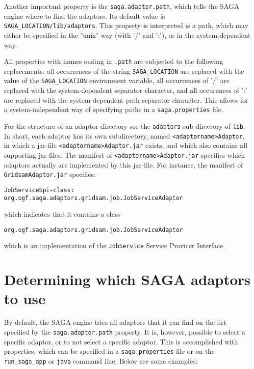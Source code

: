 \documentclass[a4paper,10pt]{article}
\begin{document}
Another important property is the \texttt{saga.adaptor.path},
which tells the SAGA engine where to find the adaptors.
Its default value is \texttt{SAGA\_LOCATION/lib/adaptors}.
This property is interpreted is a path, which may either be specified in the
"unix" way (with '/' and ':'), or in the system-dependent way.

All properties with names ending in \texttt{.path} are subjected to
the following replacements: all occurrences of the string
\texttt{SAGA\_LOCATION} are replaced with the value of the
\texttt{SAGA\_LOCATION} environment variable, all occurrences
of '/' are replaced with the system-dependent separator character,
and all occurences of ':' are replaced with the system-dependent
path separator character. This allows for a system-independent way
of specifying paths in a \texttt{saga.properties} file.

For the structure of an adaptor directory see the \texttt{adaptors}
sub-directory of \texttt{lib}.
In short, each adaptor has its own subdirectory, named
\texttt{<adaptorname>Adaptor},
in which a jar-file
\texttt{<adaptorname>Adaptor.jar}
exists, and which also contains
all supporting jar-files.
The manifest of
\texttt{<adaptorname>Adaptor.jar} specifies which adaptors actually
are implemented by this jar-file. For instance, 
the manifest of \texttt{GridsamAdaptor.jar} specifies:

\noindent
{\small
\begin{verbatim}
JobServiceSpi-class: org.ogf.saga.adaptors.gridsam.job.JobServiceAdaptor
\end{verbatim}
}
\noindent

which indicates that it contains a class
\noindent
{\small
\begin{verbatim}
org.ogf.saga.adaptors.gridsam.job.JobServiceAdaptor
\end{verbatim}
}
\noindent
which is an implementation of the \texttt{JobService}
Service Provicer Interface.

\section{Determining which SAGA adaptors to use}

By default, the SAGA engine tries all adaptors that it can find on the list
specified by the \texttt{saga.adaptor.path} property.
It is, however, possible to select a specific
adaptor, or to not select a specific adaptor. This is accomplished
with properties, which can be specified in a \texttt{saga.properties} file or
on the \texttt{run\_saga\_app} or \texttt{java} command line.
Below are some examples:
\end{document}
